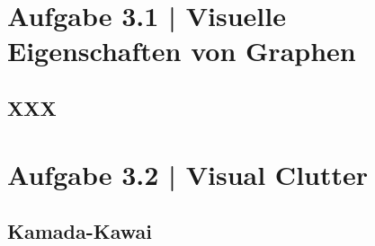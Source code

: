 \documentclass[a4paper,12pt,ngerman]{scrartcl}
\begin{document}
\pagestyle{fancy} %

\section{Aufgabe 3.1 | Visuelle Eigenschaften von Graphen}
\subsection*{XXX}

\section{Aufgabe 3.2 | Visual Clutter}
\subsection*{Kamada-Kawai}
\end{document}
